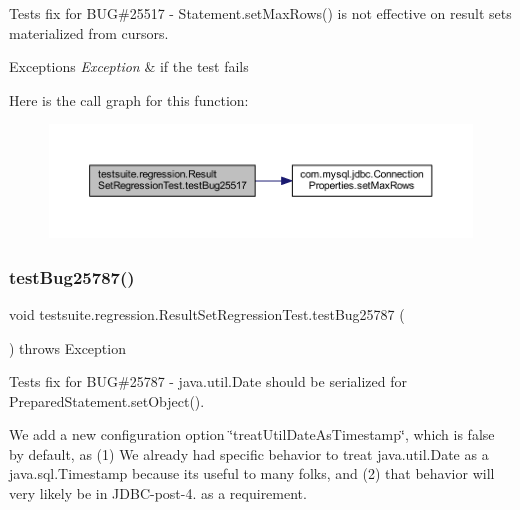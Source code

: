 Tests fix for B\+UG\#25517 -\/ Statement.\+set\+Max\+Rows() is not effective on result sets materialized from cursors.


\begin{DoxyExceptions}{Exceptions}
{\em Exception} & if the test fails \\
\hline
\end{DoxyExceptions}
Here is the call graph for this function\+:
\nopagebreak
\begin{figure}[H]
\begin{center}
\leavevmode
\includegraphics[width=350pt]{classtestsuite_1_1regression_1_1_result_set_regression_test_a70caaccac8b8006475747f9481a529af_cgraph}
\end{center}
\end{figure}
\mbox{\label{classtestsuite_1_1regression_1_1_result_set_regression_test_ac301a606f76010d277f5daf49e296b01}} 
\subsubsection{\texorpdfstring{test\+Bug25787()}{testBug25787()}}
{\footnotesize\ttfamily void testsuite.\+regression.\+Result\+Set\+Regression\+Test.\+test\+Bug25787 (\begin{DoxyParamCaption}{ }\end{DoxyParamCaption}) throws Exception}

Tests fix for B\+UG\#25787 -\/ java.\+util.\+Date should be serialized for Prepared\+Statement.\+set\+Object().

We add a new configuration option \char`\"{}treat\+Util\+Date\+As\+Timestamp\char`\"{}, which is false by default, as (1) We already had specific behavior to treat java.\+util.\+Date as a java.\+sql.\+Timestamp because it\textquotesingle{}s useful to many folks, and (2) that behavior will very likely be in J\+D\+B\+C-\/post-\/4. as a requirement.


